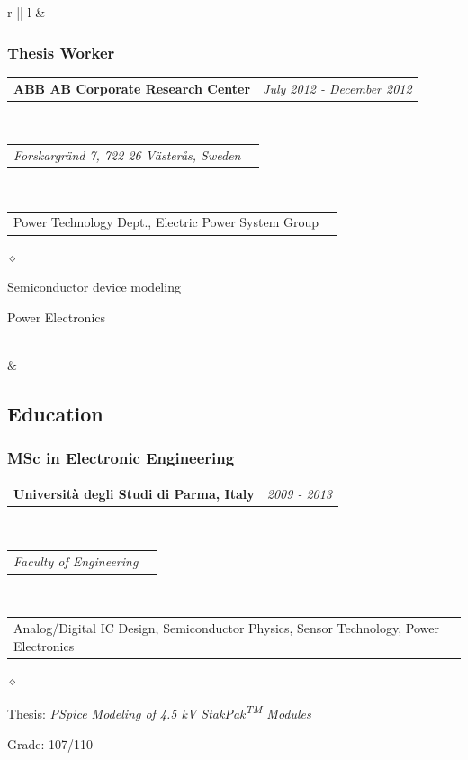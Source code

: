 \documentclass[a4paper]{article}
\makeatletter
\newlength{\sectsep}
\newlength{\subsectsep}
\newcommand{\headerrow}[2]
{\begin{tabular*}{\textwidth}{l@{\extracolsep{\fill}}r}
    #1 &
    #2 \\
\end{tabular*}}
\renewenvironment{itemize}{
  \begin{list}{$\diamond$}{
    \setlength{\topsep}{0.1em}
    \setlength{\itemsep}{0em}
    \setlength{\parskip}{0pt}
    \setlength{\parsep}{0em}
  }
}{
  \end{list}
}
\makeatother
\begin{document}
\begin{longtable}{r || l}
  & \begin{minipage}{0.9\textwidth}
      \vspace{\subsectsep}
      \subsubsection*{Thesis Worker}
      \headerrow
        {\textbf{ABB AB Corporate Research Center}}{\emph{July 2012 - December 2012}}
      \\
      \headerrow
        {\emph{Forskargränd 7, 722 26 Västerås, Sweden}}{}
      \\
      \headerrow
          {Power Technology Dept., Electric Power System Group}{}

      \begin{itemize}
          \item Semiconductor device modeling
          \item Power Electronics
      \end{itemize}
      \vspace{1ex}
  \end{minipage} \\[\sectsep]

  & \begin{minipage}{0.9\textwidth}
      \vspace{0.5\sectsep}
      \subsection*{Education}
      \subsubsection*{MSc in Electronic Engineering}
      \headerrow
        {\textbf{Università degli Studi di Parma, Italy}}{\emph{2009 - 2013}}
      \\
      \headerrow
        {\emph{Faculty of Engineering}}{}
      \\
      \headerrow
        {Analog/Digital IC Design, Semiconductor Physics, Sensor Technology, Power Electronics}{}

      \begin{itemize}
          \item Thesis: \emph{PSpice Modeling of 4.5 kV StakPak\textsuperscript{TM} Modules}
          \item Grade: 107/110
      \end{itemize}
      \vfill
  \end{minipage} \\[\sectsep]


\end{longtable}
\end{document}

